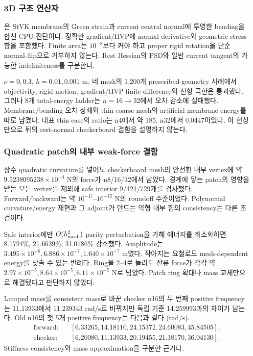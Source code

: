 \documentclass[10pt]{article}
\begin{document}
\subsubsection{3D 구조 연산자}

은 StVK membrane의 Green strain과
current central normal에 투영한 bending을 합친 CPU 진단이다.
정확한 gradient/HVP에 normal derivative와 geometric-stress 항을 포함했다.
Finite area는 \(10^{-8}\)보다 커야 하고 proper rigid rotation을 단순 normal-flip으로 거부하지 않는다.
Rest Hessian의 PSD와 일반 current tangent의 가능한 indefiniteness를 구분한다.

\(\nu=0,0.3\), \(h=0.01,0.001\) m, 네 mesh의 1,200개 prescribed-geometry 사례에서
objectivity, rigid motion, gradient/HVP finite difference와 선형 극한은 통과했다.
그러나 8개 total-energy ladder는 \(n=16\to32\)에서 오차 감소에 실패했다.
Membrane/bending 오차 상쇄와 thin coarse mesh의 artificial membrane energy를 따로 남겼다.
대표 thin case의 ratio는 n4에서 약 185, n32에서 0.0447이었다.
이 현상만으로 뒤의 rest-normal checkerboard 결함을 설명하지 않는다.

\subsubsection{Quadratic patch의 내부 weak-force 결함}

상수 quadratic curvature를 넣어도 checkerboard mesh의 안전한 내부 vertex에 약
\(9.5238095238\times10^{-4}\) N의 force가 n8/16/32에서 남았다.
경계에 닿는 patch의 영향을 받는 모든 vertex를 제외해 safe interior 9/121/729개를 검사했다.
Forward/backward는 약 \(10^{-17}\)--\(10^{-15}\) N의 roundoff 수준이었다.
Polynomial curvature/energy 재현과 그 adjoint가 만드는 약형 내부 힘의 consistency는 다른 조건이다.

Safe interior에만 \(O(h_{\rm mesh}^2)\) parity perturbation을 가해 에너지를 최소화하면
8.1794\%, 21.6639\%, 31.0786\% 감소했다. Amplitude는
\(3.495\times10^{-6},6.886\times10^{-7},1.640\times10^{-7}\) m였다.
작아지는 요철로도 mesh-dependent energy를 낮출 수 있는 반례다.
Ring을 2--4로 늘려도 잔류 force가 각각 약
\(2.97\times10^{-5},8.64\times10^{-5},6.11\times10^{-5}\) N로 남았다.
Patch ring 확대나 mass 교체만으로 해결됐다고 판단하지 않았다.

Lumped mass를 consistent mass로 바꾼 checker n16의 두 번째 positive frequency는
11.13933에서 11.239343 rad/s로 바뀌지만 독립 기준 14.259993과의 차이가 남는다.
Old n16의 첫 5개 positive frequency는 다음과 같다 (rad/s).
\[
\begin{aligned}
\text{forward}:&\quad[6.33265,14.18110,24.15372,24.60083,45.84505],\\
\text{checker}:&\quad[6.20080,11.13933,20.19455,21.38170,36.04130].
\end{aligned}
\]
Stiffness consistency와 mass approximation을 구분한 근거다.
\end{document}
